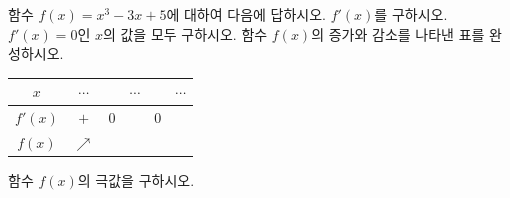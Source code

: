 함수 $f(x)=x^3-3x+5$에 대하여 다음에 답하시오.
 $f'(x)$를 구하시오.
 $f'(x)=0$인 $x$의 값을 모두 구하시오.
 함수 $f(x)$의 증가와 감소를 나타낸 표를 완성하시오.\par\smallskip\begin{center}\renewcommand{\arraystretch}{1.6}\begin{tabular}{c|c|c|c|c|c}\hline $x$ & $\cdots$ & \phantom{$\cdots$} & $\cdots$ & \phantom{$\cdots$} & $\cdots$ \\ \hline $f'(x)$ & $+$ & $0$ & \phantom{$\cdots$} & $0$ & \phantom{$\cdots$} \\ \hline $f(x)$ & $\nearrow$ & & & & \\ \hline\end{tabular}\end{center}
 함수 $f(x)$의 극값을 구하시오.
